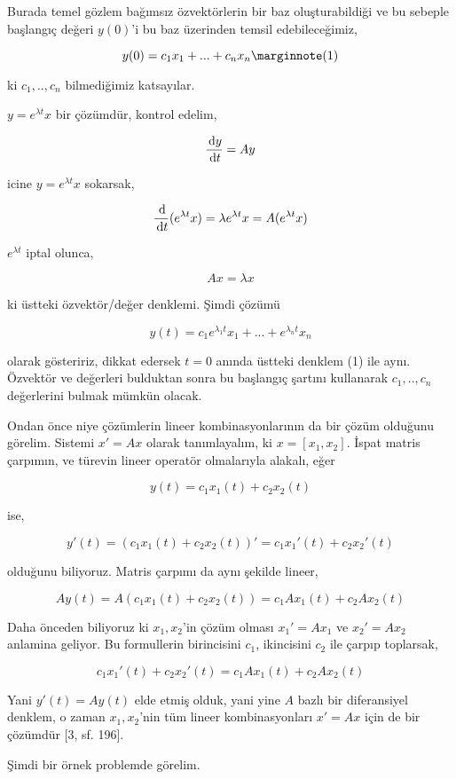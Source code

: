 \documentclass[12pt,fleqn]{article}\usepackage{../../common}
\begin{document}
Burada temel gözlem bağımsız özvektörlerin bir baz oluşturabildiği ve bu
sebeple başlangıç değeri $y(0)$'i bu baz üzerinden temsil edebileceğimiz,

$$
y(0) = c_1 x_1 + ... + c_n x_n
\mlabel{1}
$$

ki $c_1,..,c_n$ bilmediğimiz katsayılar.

$y = e^{\lambda t} x$ bir çözümdür, kontrol edelim,

$$
\frac{\,\mathrm{d} y}{\,\mathrm{d} t} = A y
$$

icine $y = e^{\lambda t} x$ sokarsak,

$$
\frac{\,\mathrm{d} }{\,\mathrm{d} t} ( e^{\lambda t} x) =
\lambda e^{\lambda t} x =
A (e^{\lambda  t} x)
$$

$e^{\lambda  t}$  iptal olunca,

$$
Ax = \lambda x 
$$

ki üstteki özvektör/değer denklemi. Şimdi çözümü

$$
y(t) = c_1 e^{\lambda_1 t} x_1 + ... + e^{\lambda_n t} x_n
$$

olarak gösteririz, dikkat edersek $t=0$ anında üstteki denklem (1) ile aynı.
Özvektör ve değerleri bulduktan sonra bu başlangıç şartını kullanarak
$c_1,..,c_n$ değerlerini bulmak mümkün olacak.

Ondan önce niye çözümlerin lineer kombinasyonlarının da bir çözüm olduğunu
görelim. Sistemi $x' = Ax$ olarak tanımlayalım, ki $x = [x_1, x_2]$.  İspat
matris çarpımın, ve türevin lineer operatör olmalarıyla alakalı, eğer

$$
y(t) = c_1 x_1(t) + c_2 x_2(t)
$$

ise,

$$
y'(t) = (c_1 x_1(t) + c_2 x_2(t))' = c_1 x_1'(t) + c_2 x_2'(t)
$$

olduğunu biliyoruz. Matris çarpımı da aynı şekilde lineer,

$$
A y(t) = A(c_1 x_1(t) + c_2 x_2(t)) = c_1 A x_1(t) + c_2 A x_2(t)
$$

Daha önceden biliyoruz ki $x_1,x_2$'in çözüm olması $x_1'=Ax_1$ ve
$x_2' = A x_2$ anlamina geliyor. Bu formullerin birincisini $c_1$,
ikincisini $c_2$ ile çarpıp toplarsak,

$$
c_1 x_1'(t) + c_2 x_2'(t) = c_1 A x_1(t) + c_2 A x_2(t)
$$

Yani $y'(t) = A y(t)$ elde etmiş olduk, yani yine $A$ bazlı bir diferansiyel
denklem, o zaman $x_1,x_2$'nin tüm lineer kombinasyonları $x' = Ax$ için de bir
çözümdür [3, sf. 196].

Şimdi bir örnek problemde görelim.
\end{document}
